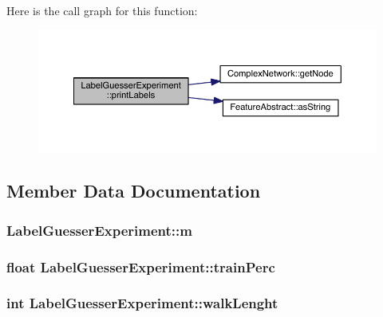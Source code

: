 Here is the call graph for this function\+:
\nopagebreak
\begin{figure}[H]
\begin{center}
\leavevmode
\includegraphics[width=350pt]{class_label_guesser_experiment_a835363da6b06ec1402823493ef933179_cgraph}
\end{center}
\end{figure}




\subsection{Member Data Documentation}
\hypertarget{class_label_guesser_experiment_a0a0032a29818ba490865d85ac1403b0d}{
\subsubsection[{m}]{ Label\+Guesser\+Experiment\+::m\hspace{0.3cm}{\ttfamily [private]}}}\label{class_label_guesser_experiment_a0a0032a29818ba490865d85ac1403b0d}
\hypertarget{class_label_guesser_experiment_a24da553164e05d31f67156c70b946fef}{
\subsubsection[{train\+Perc}]{\setlength{\rightskip}{0pt plus 5cm}float Label\+Guesser\+Experiment\+::train\+Perc\hspace{0.3cm}{\ttfamily [private]}}}\label{class_label_guesser_experiment_a24da553164e05d31f67156c70b946fef}
\hypertarget{class_label_guesser_experiment_a5038af94a1310577da234f589c19c77e}{
\subsubsection[{walk\+Lenght}]{\setlength{\rightskip}{0pt plus 5cm}int Label\+Guesser\+Experiment\+::walk\+Lenght\hspace{0.3cm}{\ttfamily [private]}}}\label{class_label_guesser_experiment_a5038af94a1310577da234f589c19c77e}


